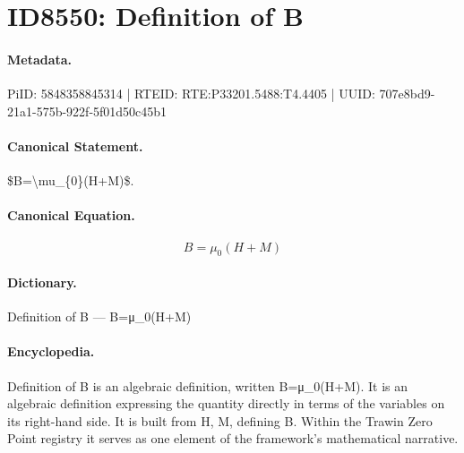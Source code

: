 \section*{ID8550: Definition of B}
\paragraph{Metadata.}
PiID: 5848358845314 | RTEID: RTE:P33201.5488:T4.4405 | UUID: 707e8bd9-21a1-575b-922f-5f01d50c45b1

\paragraph{Canonical Statement.}
\$B=\textbackslash{}mu\_\{0\}(H+M)\$.

\paragraph{Canonical Equation.}
\[
B=\mu_{0}(H+M)
\]

\paragraph{Dictionary.}
Definition of B — B=μ\_0(H+M)

\paragraph{Encyclopedia.}
Definition of B is an algebraic definition, written B=μ\_0(H+M). It is an algebraic definition expressing the quantity directly in terms of the variables on its right-hand side. It is built from H, M, defining B. Within the Trawin Zero Point registry it serves as one element of the framework's mathematical narrative.

